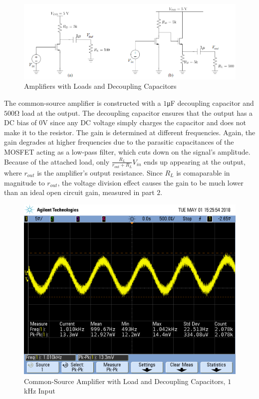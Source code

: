 
\FloatBarrier

\begin{figure}[h!]
	\centering
	\includegraphics[scale=0.60]{./images/circuit_3.PNG}
	\caption{Amplifiers with Loads and Decoupling Capacitors}
	\label{fig:circuit_3}
\end{figure}

\FloatBarrier
The common-source amplifier is constructed with a $1$\si{\micro\farad} decoupling capacitor and $500$\si{\ohm} load at the output.
The decoupling capacitor ensures that the output has a DC bias of $0$\si{\volt} since any DC voltage simply charges the capacitor and does not make it to the resistor.
The gain is determined at different frequencies.
Again, the gain degrades at higher frequencies due to the parasitic capacitances of the MOSFET acting as a low-pass filter, which cuts down on the signal's amplitude.
Because of the attached load, only $\frac{R_{L}}{r_{out} + R_{L}}V_{in}$ ends up appearing at the output, where $r_{out}$ is the amplifier's output resistance.
Since $R_{L}$ is comaparable in magnitude to $r_{out}$, the voltage division effect causes the gain to be much lower than an ideal open circuit gain, measured in part $2$.

\FloatBarrier

\begin{figure}[h!]
	\centering
	\includegraphics[scale=0.45]{./images/SCOPE_13.PNG}
	\caption{Common-Source Amplifier with Load and Decoupling Capacitors, $1$\si{\kilo\hertz} Input}
	\label{fig:SCOPE_13}
\end{figure}


